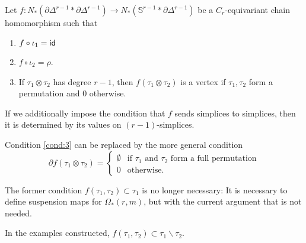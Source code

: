 	\renewcommand{\theenumi}{\roman{enumi}}
	Let $f\colon N_*(\partial\Delta^{r-1}*\partial\Delta^{r-1})\to N_*(\mathbb{S}^{r-1}*\partial\Delta^{r-1})$ be a $C_r$-equivariant chain homomorphism such that
	\begin{enumerate}
		\item\label{cond:1} $f\circ \iota_1 = \mathsf{id}$
		\item\label{cond:2} $f\circ \iota_2 = \rho$.
		\item\label{cond:3} If $\tau_1\otimes\tau_2$ has degree $r-1$, then $f(\tau_1\otimes \tau_2)$ is a vertex if $\tau_1,\tau_2$ form a permutation and $0$ otherwise.
	\end{enumerate}
	\begin{remark} If we additionally impose the condition that $f$ sends simplices to simplices, then it is determined by its values on $(r-1)$-simplices.
	\end{remark}
	\begin{remark} Condition \eqref{cond:3} can be replaced by the more general condition
		\[\partial f(\tau_1\otimes\tau_2) = \begin{cases}
			\emptyset & \text{if $\tau_1$ and $\tau_2$ form a full permutation} \\
			0 & \text{otherwise}.\end{cases}\]
	\end{remark}
	\begin{remark} The former condition $f(\tau_1,\tau_2)\subset \tau_1$ is no longer necessary: It is necessary to define suspension maps for $\Omega_*(r,m)$, but with the current argument that is not needed.
	\end{remark}
	\begin{remark} In the examples constructed, $f(\tau_1,\tau_2)\subset \tau_1\smallsetminus \tau_2$.
	\end{remark}

